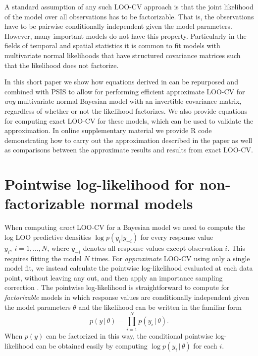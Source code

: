 \documentclass[11pt]{article}
\begin{document}
A standard assumption of any such LOO-CV approach is that the joint likelihood
of the model over all observations has to be factorizable. That is, the
observations have to be pairwise conditionally independent given the model
parameters. However, many important models do not have this property. Particularly
in the fields of temporal and spatial statistics it is common to fit models with
multivariate normal likelihoods that have structured covariance matrices such
that the likelihood does not factorize.

In this short paper we show how equations derived in \cite{sundararajan2001} 
can be repurposed and combined with PSIS to allow for performing efficient approximate 
LOO-CV for \emph{any} multivariate normal Bayesian model with an invertible covariance matrix, 
regardless of whether or not the likelihood factorizes. We also provide equations for computing
exact LOO-CV for these models, which can be used to validate the approximation. 
In online supplementary material we provide R code demonstrating how to carry out the approximation 
described in the paper as well as comparisons between the approximate results and results from 
exact LOO-CV.


\section{Pointwise log-likelihood for non-factorizable normal models}

When computing \emph{exact} LOO-CV for a Bayesian model we need to compute the 
log LOO predictive densities $\log{p(y_i | y_{-i})}$ for every response value 
$y_i, \: i = 1, \ldots, N$, where $y_{-i}$ denotes all response values except observation $i$. 
This requires fitting the model $N$ times. For \emph{approximate} LOO-CV 
using only a single model fit, we instead calculate the pointwise log-likelihood evaluated
at each data point, without leaving any out, and then apply an importance sampling 
correction \citep{vehtari2017loo}. The pointwise log-likelihood is straightforward to compute 
for \emph{factorizable} models in which response values are conditionally independent 
given the model parameters $\theta$ and the likelihood can be written in the familiar form
%
\begin{equation}
p(y \,|\, \theta) = \prod_{i=1}^N p(y_i \,|\, \theta).
\end{equation}
%
When $p(y)$ can be factorized in this way, the conditional pointwise log-likelihood can be obtained 
easily by computing $\log p(y_i \,|\, \theta)$ for each $i$.
\end{document}
